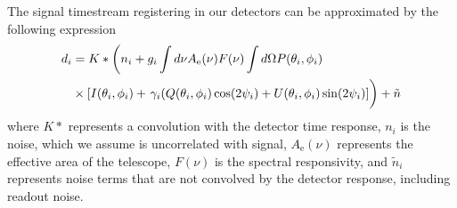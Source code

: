 The signal timestream registering in our detectors can be approximated by the following expression
\begin{equation}
\begin{split}
d _i &= K \ast \left( n_i + g_i \int d \nu A_\mathrm{e} (\nu) F(\nu) \int d\Omega P (\theta _i,\phi _i) \right. \\ 
&\times [I(\theta _i, \phi _i) + \left. \gamma _i (Q(\theta _i,\phi _i)\cos (2\psi _i) + U(\theta _i,\phi _i) \sin (2\psi _i) ]  \vphantom{\int } \right) + \tilde{n}
\end{split}
\end{equation}
where $K \ast$ represents a convolution with the detector time response, $n_i$ is the noise, which we assume is uncorrelated with signal, $A_{\mathrm{e}} (\nu)$ represents the effective area of the telescope, $F(\nu)$ is the spectral responsivity, and $\tilde{n}_i$ represents noise terms that are not convolved by the detector response, including readout noise. 